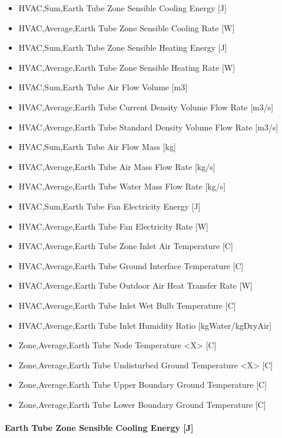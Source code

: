 \begin{itemize}
\item
  HVAC,Sum,Earth Tube Zone Sensible Cooling Energy {[}J{]}
\item
  HVAC,Average,Earth Tube Zone Sensible Cooling Rate {[}W{]}
\item
  HVAC,Sum,Earth Tube Zone Sensible Heating Energy {[}J{]}
\item
  HVAC,Average,Earth Tube Zone Sensible Heating Rate {[}W{]}
\item
  HVAC,Sum,Earth Tube Air Flow Volume {[}m3{]}
\item
  HVAC,Average,Earth Tube Current Density Volume Flow Rate {[}m3/s{]}
\item
  HVAC,Average,Earth Tube Standard Density Volume Flow Rate {[}m3/s{]}
\item
  HVAC,Sum,Earth Tube Air Flow Mass {[}kg{]}
\item
  HVAC,Average,Earth Tube Air Mass Flow Rate {[}kg/s{]}
\item
  HVAC,Average,Earth Tube Water Mass Flow Rate {[}kg/s{]}
\item
  HVAC,Sum,Earth Tube Fan Electricity Energy {[}J{]}
\item
  HVAC,Average,Earth Tube Fan Electricity Rate {[}W{]}
\item
  HVAC,Average,Earth Tube Zone Inlet Air Temperature {[}C{]}
\item
  HVAC,Average,Earth Tube Ground Interface Temperature {[}C{]}
\item
  HVAC,Average,Earth Tube Outdoor Air Heat Transfer Rate {[}W{]}
\item
  HVAC,Average,Earth Tube Inlet Wet Bulb Temperature {[}C{]}
\item
  HVAC,Average,Earth Tube Inlet Humidity Ratio {[}kgWater/kgDryAir{]}
\item
  Zone,Average,Earth Tube Node Temperature <X> {[}C{]}
\item
  Zone,Average,Earth Tube Undisturbed Ground Temperature <X> {[}C{]}
\item
  Zone,Average,Earth Tube Upper Boundary Ground Temperature {[}C{]}
\item
  Zone,Average,Earth Tube Lower Boundary Ground Temperature {[}C{]}
\end{itemize}

\paragraph{Earth Tube Zone Sensible Cooling Energy {[}J{]}}\label{earth-tube-zone-sensible-cooling-energy-j}


